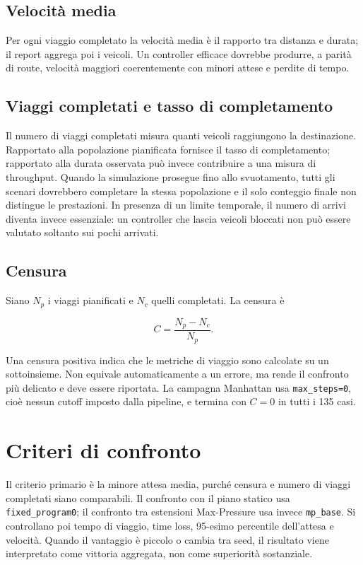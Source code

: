 \documentclass[12pt,a4paper,oneside]{report}
\numberwithin{equation}{chapter}
\begin{document}
\subsection{Velocità media}

Per ogni viaggio completato la velocità media è il rapporto tra distanza e
durata; il report aggrega poi i veicoli. Un controller efficace dovrebbe
produrre, a parità di route, velocità maggiori coerentemente con minori attese
e perdite di tempo.

\subsection{Viaggi completati e tasso di completamento}

Il numero di viaggi completati misura quanti veicoli raggiungono la
destinazione. Rapportato alla popolazione pianificata fornisce il tasso di
completamento; rapportato alla durata osservata può invece contribuire a una
misura di throughput. Quando la simulazione prosegue fino allo svuotamento,
tutti gli scenari dovrebbero completare la stessa popolazione e il solo
conteggio finale non distingue le prestazioni. In presenza di un limite
temporale, il numero di arrivi diventa invece essenziale: un controller che
lascia veicoli bloccati non può essere valutato soltanto sui pochi arrivati.

\subsection{Censura}

Siano $N_p$ i viaggi pianificati e $N_c$ quelli completati. La censura è

\begin{equation}
    C=\frac{N_p-N_c}{N_p}.
    \label{eq:censoring}
\end{equation}

Una censura positiva indica che le metriche di viaggio sono calcolate su un
sottoinsieme. Non equivale automaticamente a un errore, ma rende il confronto
più delicato e deve essere riportata. La campagna Manhattan usa
\texttt{max\_steps=0}, cioè nessun cutoff imposto dalla pipeline, e termina con
$C=0$ in tutti i 135 casi.

\section{Criteri di confronto}

Il criterio primario è la minore attesa media, purché censura e numero di
viaggi completati siano comparabili. Il confronto con il piano statico usa
\texttt{fixed\_program0}; il confronto tra estensioni Max-Pressure usa invece
\texttt{mp\_base}. Si controllano poi tempo di viaggio, time loss, 95-esimo
percentile dell'attesa e velocità. Quando il vantaggio è piccolo o cambia tra
seed, il risultato viene interpretato come vittoria aggregata, non come
superiorità sostanziale.
\end{document}
